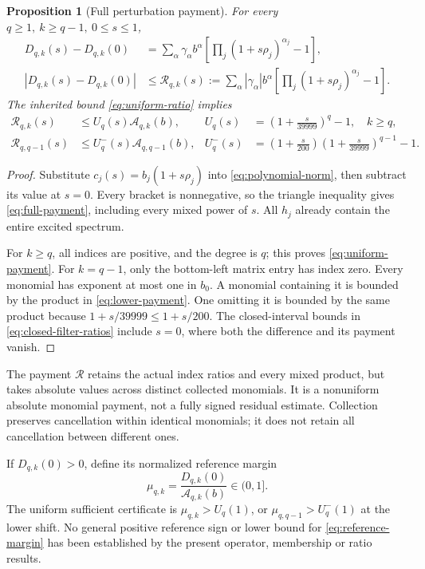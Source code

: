 \documentclass[11pt,letterpaper]{article}
\numberwithin{equation}{section}
\newtheorem{proposition}[theorem]{Proposition}
\theoremstyle{remark}
\newcommand{\Acal}{\mathcal A}
\newcommand{\Rcal}{\mathcal R}
\begin{document}
\begin{proposition}[Full perturbation payment]\label{prop:payment}
For every \(q\ge1,\ k\ge q-1,\ 0\le s\le1\),
\begin{align}
 D_{q,k}(s)-D_{q,k}(0)
 &=\sum_\alpha\gamma_\alpha b^\alpha
 \left[\prod_j(1+s\rho_j)^{\alpha_j}-1\right], \label{eq:signed-difference}\\
 |D_{q,k}(s)-D_{q,k}(0)|
 &\le\Rcal_{q,k}(s):=
 \sum_\alpha|\gamma_\alpha|b^\alpha
 \left[\prod_j(1+s\rho_j)^{\alpha_j}-1\right]. \label{eq:full-payment}
\end{align}
The inherited bound \eqref{eq:uniform-ratio} implies
\begin{align}
 \Rcal_{q,k}(s)&\le U_q(s)\Acal_{q,k}(b),&
 U_q(s)&=\left(1+\frac{s}{39999}\right)^q-1,\quad k\ge q,
 \label{eq:uniform-payment}\\
 \Rcal_{q,q-1}(s)&\le U_q^-(s)\Acal_{q,q-1}(b),&
 U_q^-(s)&=\left(1+\frac{s}{200}\right)
 \left(1+\frac{s}{39999}\right)^{q-1}-1.
 \label{eq:lower-payment}
\end{align}
\end{proposition}
\begin{proof}
Substitute \(c_j(s)=b_j(1+s\rho_j)\) into
\eqref{eq:polynomial-norm}, then subtract its value at \(s=0\).
Every bracket is nonnegative, so the triangle inequality gives
\eqref{eq:full-payment}, including every mixed power of \(s\).
All \(h_j\) already contain the entire excited spectrum.

For \(k\ge q\), all indices are positive, and the degree is \(q\);
this proves \eqref{eq:uniform-payment}.
For \(k=q-1\), only the bottom-left matrix entry has index zero.
Every monomial has exponent at most one in \(b_0\).
A monomial containing it is bounded by the product in
\eqref{eq:lower-payment}. One omitting it is bounded by the same
product because \(1+s/39999\le1+s/200\).
The closed-interval bounds in \eqref{eq:closed-filter-ratios} include
\(s=0\), where both the difference and its payment vanish.
\end{proof}

The payment \(\Rcal\) retains the actual index ratios and every mixed
product, but takes absolute values across distinct collected monomials.
It is a nonuniform absolute monomial payment, not a fully signed
residual estimate. Collection preserves cancellation within identical
monomials; it does not retain all cancellation between different ones.

If \(D_{q,k}(0)>0\), define its normalized reference margin
\begin{equation}
 \mu_{q,k}=\frac{D_{q,k}(0)}{\Acal_{q,k}(b)}\in(0,1].
 \label{eq:reference-margin}
\end{equation}
The uniform sufficient certificate is
\(\mu_{q,k}>U_q(1)\), or
\(\mu_{q,q-1}>U_q^-(1)\) at the lower shift.
No general positive reference sign or lower bound for
\eqref{eq:reference-margin} has been established by the present
operator, membership or ratio results.
\end{document}
